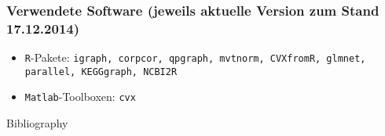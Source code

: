 \documentclass{beamer}
\begin{document}
\begin{frame}
	\frametitle{Verwendete Software (jeweils aktuelle Version zum Stand 17.12.2014)}
	\begin{itemize}
	\item \texttt{R}-Pakete: \texttt{igraph, corpcor, qpgraph, mvtnorm, CVXfromR, glmnet, parallel, KEGGgraph, NCBI2R}
	\item \texttt{Matlab}-Toolboxen: \texttt{cvx}
	\end{itemize}
\end{frame}


\begin{frame}{Bibliography}


\end{frame}


%
\end{document}
